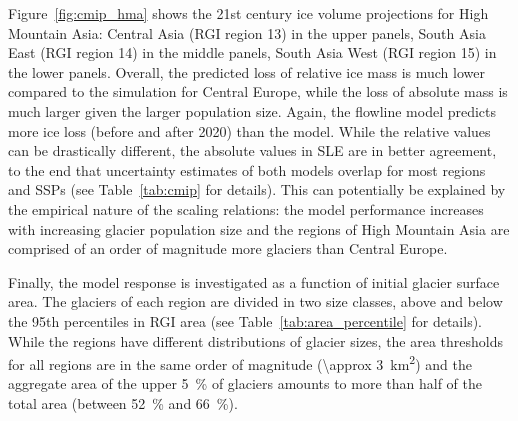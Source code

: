       Figure~\ref{fig:cmip_hma} shows the 21st century ice volume projections for High Mountain Asia: Central Asia (RGI region 13) in the upper panels, South Asia East (RGI region 14) in the middle panels, South Asia West (RGI region 15) in the lower panels. Overall, the predicted loss of relative ice mass is much lower compared to the simulation for Central Europe, while the loss of absolute mass is much larger given the larger population size. Again, the flowline model predicts more ice loss (before and after 2020) than the \vas{} model. While the relative values can be drastically different, the absolute values in SLE are in better agreement, to the end that uncertainty estimates of both models overlap for most regions and SSPs (see Table~\ref{tab:cmip} for details). This can potentially be explained by the empirical nature of the scaling relations: the model performance increases with increasing glacier population size and the regions of High Mountain Asia are comprised of an order of magnitude more glaciers than Central Europe.


      Finally, the model response is investigated as a function of initial glacier surface area. The glaciers of each region are divided in two size classes, above and below the 95th percentiles in RGI area (see Table~\ref{tab:area_percentile} for details). While the regions have different distributions of glacier sizes, the area thresholds for all regions are in the same order of magnitude (\SI{\approx 3}{\square\kilo\meter}) and the aggregate area of the upper \SI{5}{\percent} of glaciers amounts to more than half of the total area (between \SI{52}{\percent} and \SI{66}{\percent}).

